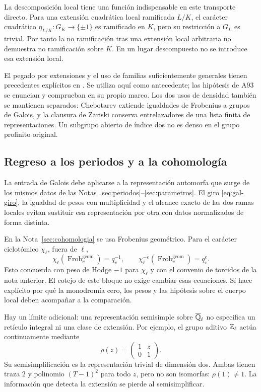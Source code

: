 La descomposición local tiene una función indispensable en este
transporte directo. Para una extensión cuadrática local ramificada
$L/K$, el carácter cuadrático
$\eta_{L/K}:G_K\to\{\pm1\}$ es ramificado en $K$, pero su
restricción a $G_L$ es trivial.
Por tanto la no ramificación tras una extensión local arbitraria
no demuestra no ramificación sobre $K$.
En un lugar descompuesto no se introduce esa extensión local.

El pegado por extensiones y el uso de familias suficientemente
generales tienen precedentes explícitos en
\cite{sorensen-patching}. Se utiliza aquí como antecedente;
las hipótesis de A93 se enuncian y comprueban en su propio marco.
Los dos usos de densidad también se mantienen separados:
Chebotarev extiende igualdades de Frobenius a grupos de Galois,
y la clausura de Zariski conserva entrelazadores de una lista
finita de representaciones.
Un subgrupo abierto de índice dos no es denso en el grupo
profinito original.

\subsection{Regreso a los periodos y a la cohomología}

La entrada de Galois debe aplicarse a la representación automorfa
que surge de los mismos datos de las
Notas~\ref{sec:periodos}--\ref{sec:parametros}.
El giro \eqref{eq:gal-giro}, la igualdad de pesos con multiplicidad
y el alcance exacto de las dos ramas locales evitan sustituir
esa representación por otra con datos normalizados de forma distinta.

En la Nota~\ref{sec:cohomologia} se usa Frobenius geométrico.
Para el carácter ciclotómico $\chi_\ell$, fuera de $\ell$,
\begin{equation}
 \chi_\ell(\operatorname{Frob}^{\mathrm{geom}}_v)=q_v^{-1},
 \qquad
 \chi_\ell^{-e}(\operatorname{Frob}^{\mathrm{geom}}_v)=q_v^e.
 \label{eq:gal-ciclotomico}
\end{equation}
Esto concuerda con peso de Hodge $-1$ para $\chi_\ell$
y con el convenio de torcidos de la nota anterior.
El cotejo de este bloque no exige cambiar esas ecuaciones.
Sí hace explícito por qué la monodromía cero, los pesos y las
hipótesis sobre el cuerpo local deben acompañar a la comparación.

Hay un límite adicional: una representación semisimple sobre
$\overline{\mathbb{Q}}_\ell$ no especifica un retículo integral ni una
clase de extensión. Por ejemplo, el grupo aditivo $\mathbb{Z}_\ell$
actúa continuamente mediante
\begin{equation}
 \rho(z)=
 \begin{pmatrix}1&z\\0&1\end{pmatrix}.
 \label{eq:gal-unipotente}
\end{equation}
Su semisimplificación es la representación trivial de dimensión
dos. Ambas tienen traza $2$ y polinomio $(T-1)^2$ para todo $z$,
pero no son isomorfas: $\rho(1)\ne1$.
La información que detecta la extensión se pierde al semisimplificar.

